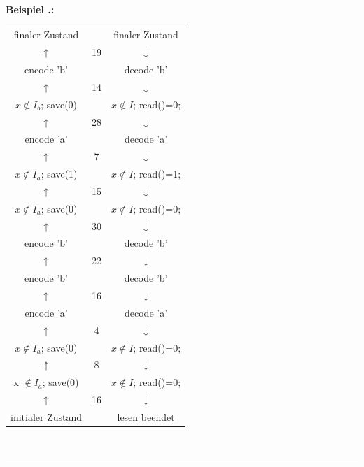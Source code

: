 \documentclass[a4paper,12pt]{article}
\newcounter{Beispiel}
\newenvironment{Beispiel}{
\medskip
        
        \setlength{\parindent}{0pt}
        \addtocounter{Beispiel}{1}
        \textbf{\textsf{Beispiel \thesubsection.\theBeispiel}:}\\}{
        \nopagebreak
        \vspace{-1.0ex}
        \bigskip
        
}
\begin{document}
\begin{Beispiel}
\begin{center}
\begin{tabular}{c c c}
finaler Zustand & & finaler Zustand
\\
$\uparrow$ & 19 & $\downarrow$
\\
encode 'b' & & decode 'b'
\\
$\uparrow$ & 14 & $\downarrow$
\\
$x \not\in I_{b}$; save(0) &  &$x\not\in I$; read()=0;
\\
$\uparrow$ & 28 & $\downarrow$
\\
encode 'a' & & decode 'a'
\\
$\uparrow$ & 7 & $\downarrow$
\\
$x \not\in I_{a}$; save(1) &  &$x\not\in I$; read()=1;
\\
$\uparrow$ & 15 & $\downarrow$
\\
$x \not\in I_{a}$; save(0) &  &$x\not\in I$; read()=0;
\\
$\uparrow$ & 30 & $\downarrow$
\\
encode 'b' & & decode 'b'
\\
$\uparrow$ & 22 & $\downarrow$
\\
encode 'b' & & decode 'b'
\\
$\uparrow$ & 16 & $\downarrow$
\\
encode 'a' & & decode 'a'
\\
$\uparrow$ & 4 & $\downarrow$
\\
$x \not\in I_{a}$; save(0) &  & $x\not\in I$; read()=0;
\\
$\uparrow$ & 8 & $\downarrow$
\\
x $\not\in I_{a}$; save(0) &  & $x\not\in I$; read()=0;
\\
$\uparrow$ & 16  & $\downarrow$
\\
initialer Zustand & & lesen beendet
\end{tabular}
\\
{\color{gray!50!red}\rule{8cm}{0.1mm}}
\end{center}
\end{Beispiel}
\end{document}

